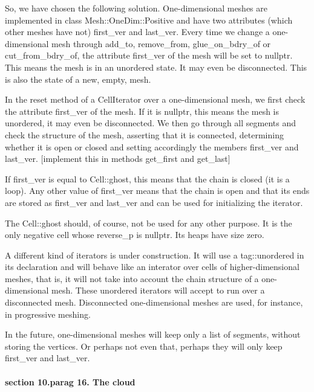 So, we have chosen the following solution.
One-dimensional meshes are implemented in class {\codett Mesh::OneDim::Positive} and have
two attributes (which other meshes have not) {\codett first\_ver} and {\codett last\_ver}.
Every time we change a one-dimensional mesh through {\codett add\_to},
{\codett remove\_from}, {\codett glue\_on\_bdry\_of} or {\codett cut\_from\_bdry\_of},
the attribute {\codett first\_ver} of the mesh will be set to {\codett nullptr}.
This means the mesh is in an unordered state.
It may even be disconnected.
This is also the state of a new, empty, mesh.

In the {\codett reset} method of a {\codett CellIterator} over a one-dimensional mesh,
we first check the attribute {\codett first\_ver} of the mesh.
If it is {\codett nullptr}, this means the mesh is unordered, it may even be disconnected.
We then go through all segments and check the structure of the mesh, 
{\codett assert}ing that it is connected, determining whether it is open or closed
and setting accordingly the members {\codett first\_ver} and {\codett last\_ver}.
[implement this in methods {\codett get\_first} and {\codett get\_last}]

If {\codett first\_ver} is equal to {\codett Cell::ghost}, this means that the chain
is closed (it is a loop).
Any other value of {\codett first\_ver} means that the chain is open and that its
ends are stored as {\codett first\_ver} and {\codett last\_ver} and can be used for
initializing the iterator.

The {\codett Cell::ghost} should, of course, not be used for any other purpose.
It is the only negative cell whose {\codett reverse\_p} is {\codett nullptr}.
Its {\codett heap}s have size zero.

A different kind of iterators is under construction.
It will use a {\codett tag::unordered} in its declaration and will behave like an interator
over cells of higher-dimensional meshes, that is, it will not take into account the chain
structure of a one-dimensional mesh.
These {\codett unordered} iterators will accept to run over a disconnected mesh.
Disconnected one-dimensional meshes are used, for instance, in progressive meshing.

In the future, one-dimensional meshes will keep only a list of segments,
without storing the vertices.
Or perhaps not even that, perhaps they will only keep {\codett first\_ver} and
{\codett last\_ver}.


\paragraph{\numb section 10.\numb parag 16. The cloud}

